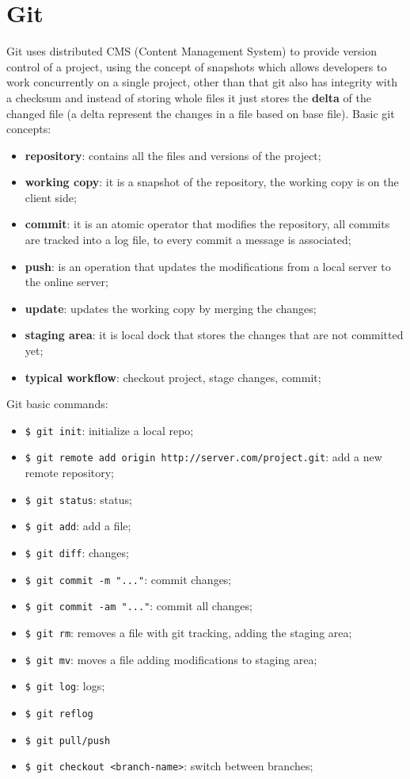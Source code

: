 \documentclass[12pt]{article}
\begin{document}
\section{Git}
Git uses distributed CMS (Content Management System) to provide version control of a project, using the concept of snapshots which allows developers to work concurrently on a single project, other than that git also has integrity with a checksum and instead of storing whole files it just stores the \textbf{delta} of the changed file (a delta represent the changes in a file based on base file). Basic git concepts:
\begin{itemize}
  \item \textbf{repository}: contains all the files and versions of the project;
  \item \textbf{working copy}: it is a snapshot of the repository, the working copy is on the client side;
  \item \textbf{commit}: it is an atomic operator that modifies the repository, all commits are tracked into a log file, to every commit a message is associated;
  \item \textbf{push}: is an operation that updates the modifications from a local server to the online server;
  \item \textbf{update}: updates the working copy by merging the changes;
  \item \textbf{staging area}: it is local dock that stores the changes that are not committed yet;
  \item \textbf{typical workflow}: checkout project, stage changes, commit;
\end{itemize}
Git basic commands: 
\begin{itemize}
  \item \texttt{\$ git init}: initialize a local repo;
  \item \texttt{\$ git remote add origin http://server.com/project.git}: add a new remote repository;
  \item \texttt{\$ git status}: status;
  \item \texttt{\$ git add}: add a file;
  \item \texttt{\$ git diff}: changes;
  \item \texttt{\$ git commit -m "..."}: commit changes;
  \item \texttt{\$ git commit -am "..."}: commit all changes;
  \item \texttt{\$ git rm}: removes a file with git tracking, adding the staging area;
  \item \texttt{\$ git mv}: moves a file adding modifications to staging area;
  \item \texttt{\$ git log}: logs;
  \item \texttt{\$ git reflog}
  \item \texttt{\$ git pull/push}
  \item \texttt{\$ git checkout <branch-name>}: switch between branches;
\end{itemize}
\end{document}
